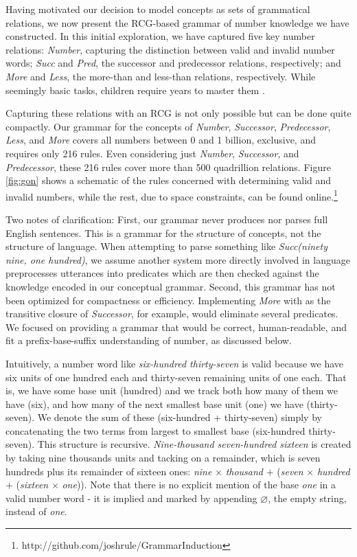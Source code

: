 \documentclass[10pt,letterpaper]{article}
\begin{document}
Having motivated our decision to model concepts as sets of grammatical
relations, we now present the RCG-based grammar of number knowledge we
have constructed. In this initial exploration, we have captured five
key number relations: \emph{Number}, capturing the distinction between
valid and invalid number words; \emph{Succ} and \emph{Pred}, the
successor and predecessor relations, respectively; and \emph{More} and
\emph{Less}, the more-than and less-than relations, respectively.
While seemingly basic tasks, children require years to master them
\citep{FusRicBriar1982}.

Capturing these relations with an RCG is not only possible but can
be done quite compactly. Our grammar for the concepts of
\emph{Number}, \emph{Successor}, \emph{Predecessor}, \emph{Less}, and
\emph{More} covers all numbers between 0 and 1 billion, exclusive, and
requires only 216 rules. Even considering just \emph{Number},
\emph{Successor}, and \emph{Predecessor}, these 216 rules cover more
than 500 quadrillion relations. Figure \ref{fig:gon} shows a schematic
of the rules concerned with determining valid and invalid numbers,
while the rest, due to space constraints, can be found
online.\footnote{http://github.com/joshrule/GrammarInduction}

Two notes of clarification: First, our grammar never produces nor
parses full English sentences. This is a grammar for the structure of
concepts, not the structure of language. When attempting to parse
something like \emph{Succ(ninety nine, one hundred)}, we assume
another system more directly involved in language preprocesses
utterances into predicates which are then checked against the
knowledge encoded in our conceptual grammar. Second, this grammar has
not been optimized for compactness or efficiency. Implementing
\emph{More} with as the transitive closure of \emph{Successor}, for
example, would eliminate several predicates. We focused on providing a
grammar that would be correct, human-readable, and fit a
prefix-base-suffix understanding of number, as discussed below.

Intuitively, a number word like \emph{six-hundred thirty-seven} is
valid because we have six units of one hundred each and thirty-seven
remaining units of one each. That is, we have some base unit (hundred)
and we track both how many of them we have (six), and how many of the
next smallest base unit (one) we have (thirty-seven). We denote the
sum of these (six-hundred + thirty-seven) simply by concatenating the
two terms from largest to smallest base (six-hundred thirty-seven).
This structure is recursive. \emph{Nine-thousand seven-hundred
  sixteen} is created by taking nine thousands units and tacking on a
remainder, which is seven hundreds plus its remainder of sixteen ones:
\emph{nine} $\times$ \emph{thousand} $+$ (\emph{seven} $\times$
\emph{hundred} + (\emph{sixteen} $\times$ \emph{one})). Note that
there is no explicit mention of the base \emph{one} in a valid number
word - it is implied and marked by appending $\varnothing$, the empty
string, instead of \emph{one}.
\end{document}
